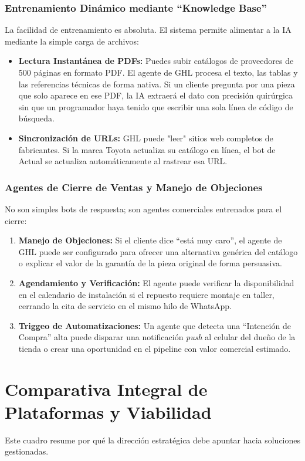 \documentclass[12pt,a4paper]{article}
\begin{document}
\subsubsection{Entrenamiento Dinámico mediante ``Knowledge Base''}
La facilidad de entrenamiento es absoluta. El sistema permite alimentar a la IA mediante la simple carga de archivos:
\begin{itemize}
    \item \textbf{Lectura Instantánea de PDFs:} Puedes subir catálogos de proveedores de 500 p\'aginas en formato PDF. El agente de GHL procesa el texto, las tablas y las referencias t\'ecnicas de forma nativa. Si un cliente pregunta por una pieza que solo aparece en ese PDF, la IA extraerá el dato con precisi\'on quirúrgica sin que un programador haya tenido que escribir una sola línea de código de búsqueda.
    \item \textbf{Sincronización de URLs:} GHL puede "leer" sitios web completos de fabricantes. Si la marca Toyota actualiza su catálogo en línea, el bot de Actual se actualiza automáticamente al rastrear esa URL.
\end{itemize}

\subsubsection{Agentes de Cierre de Ventas y Manejo de Objeciones}
No son simples bots de respuesta; son agentes comerciales entrenados para el cierre:
\begin{enumerate}
    \item \textbf{Manejo de Objeciones:} Si el cliente dice ``est\'a muy caro'', el agente de GHL puede ser configurado para ofrecer una alternativa genérica del catálogo o explicar el valor de la garantía de la pieza original de forma persuasiva.
    \item \textbf{Agendamiento y Verificación:} El agente puede verificar la disponibilidad en el calendario de instalación si el repuesto requiere montaje en taller, cerrando la cita de servicio en el mismo hilo de WhatsApp.
    \item \textbf{Triggeo de Automatizaciones:} Un agente que detecta una ``Intenci\'on de Compra'' alta puede disparar una notificación \textit{push} al celular del dueño de la tienda o crear una oportunidad en el pipeline con valor comercial estimado.
\end{enumerate}

\section{Comparativa Integral de Plataformas y Viabilidad}
Este cuadro resume por qué la dirección estrat\'egica debe apuntar hacia soluciones gestionadas.
\end{document}
